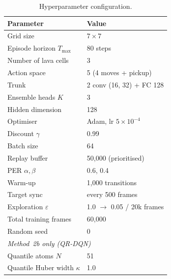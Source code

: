 \documentclass[conference]{IEEEtran}
\begin{document}
\begin{table}[!t]
\centering
\small
\setlength{\tabcolsep}{3pt}
\renewcommand{\arraystretch}{1.1}
\caption{Hyperparameter configuration.}
\label{tab:hyper}
\begin{tabular}{@{}p{}p{}@{}}
\toprule
Parameter & Value \\
\midrule
Grid size                       & $7 \times 7$ \\
Episode horizon $T_{\max}$      & 80 steps \\
Number of lava cells            & 3 \\
Action space                    & 5 (4 moves + pickup) \\
Trunk                           & 2 conv (16, 32) + FC 128 \\
Ensemble heads $K$              & 3 \\
Hidden dimension                & 128 \\
Optimiser                       & Adam, lr $5{\times}10^{-4}$ \\
Discount $\gamma$               & 0.99 \\
Batch size                      & 64 \\
Replay buffer                   & 50,000 (prioritised) \\
PER $\alpha,\beta$              & 0.6, 0.4 \\
Warm-up                         & 1,000 transitions \\
Target sync                     & every 500 frames \\
Exploration $\varepsilon$       & 1.0 $\rightarrow$ 0.05 / 20k frames \\
Total training frames           & 60,000 \\
Random seed                     & 0 \\
\midrule
\multicolumn{2}{l}{\emph{Method~2b only (QR-DQN)}} \\
Quantile atoms $N$              & 51 \\
Quantile Huber width $\kappa$   & 1.0 \\
\bottomrule
\end{tabular}
\end{table}
\end{document}
